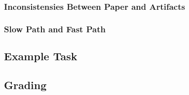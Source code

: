 \subsubsection{Inconsistensies Between Paper and Artifacts}
\label{s:inconsistencies}

\subsubsection{Slow Path and Fast Path}
\label{s:slow_and_fast}

\subsection{Example Task}
\label{s:task_example}


\subsection{Grading}
\label{s:grading}

